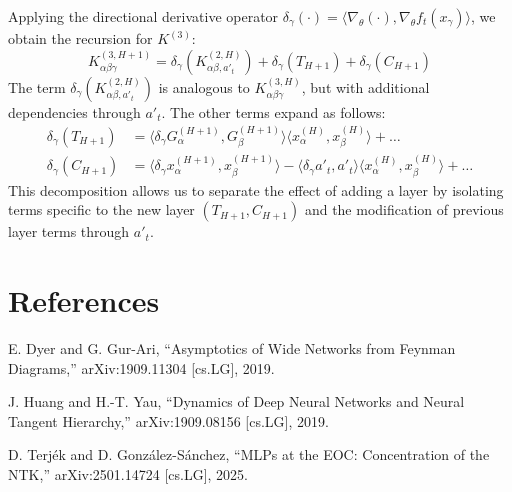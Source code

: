\documentclass[11pt,a4paper]{article}
\theoremstyle{definition}
\begin{document}
Applying the directional derivative operator $\delta_\gamma(\cdot) = \langle \nabla_\theta (\cdot), \nabla_\theta f_t(x_\gamma) \rangle$, we obtain the recursion for $K^{(3)}$:
\begin{equation}
K^{(3, H+1)}_{\alpha\beta\gamma} = \delta_\gamma \left(K^{(2,H)}_{\alpha\beta, a'_t} \right) + \delta_\gamma(T_{H+1}) + \delta_\gamma(C_{H+1})
\end{equation}
The term $\delta_\gamma \left(K^{(2,H)}_{\alpha\beta, a'_t} \right)$ is analogous to $K^{(3,H)}_{\alpha\beta\gamma}$, but with additional dependencies through $a'_t$. The other terms expand as follows:
\begin{align}
\delta_\gamma(T_{H+1}) &= \langle \delta_\gamma G^{(H+1)}_\alpha, G^{(H+1)}_\beta \rangle \langle x^{(H)}_\alpha, x^{(H)}_\beta \rangle + \dots \\
\delta_\gamma(C_{H+1}) &= \langle \delta_\gamma x^{(H+1)}_\alpha, x^{(H+1)}_\beta \rangle - \langle \delta_\gamma a'_t, a'_t \rangle \langle x^{(H)}_\alpha, x^{(H)}_\beta \rangle + \dots
\end{align}
This decomposition allows us to separate the effect of adding a layer by isolating terms specific to the new layer $(T_{H+1}, C_{H+1})$ and the modification of previous layer terms through $a'_t$.

\newpage





\appendix
\section{References}

E. Dyer and G. Gur-Ari,
``Asymptotics of Wide Networks from Feynman Diagrams,''
arXiv:1909.11304 [cs.LG], 2019.

J. Huang and H.-T. Yau,
``Dynamics of Deep Neural Networks and Neural Tangent Hierarchy,''
arXiv:1909.08156 [cs.LG], 2019.

D. Terjék and D. González-Sánchez,
``MLPs at the EOC: Concentration of the NTK,''
arXiv:2501.14724 [cs.LG], 2025.
\end{document}
